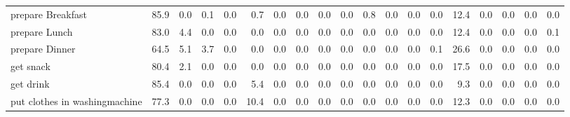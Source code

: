 \documentclass{article}
\begin{document}
\begin{sideways}
\begin{tabular}{lrrrrrrrrrrrrrrrrrr}
prepare Breakfast             &        85.9 &                0.0 &           0.1 &                          0.0 &                0.7 &                0.0 &                        0.0 &          0.0 &              0.0 &                0.8 &                    0.0 &                      0.0 &                  0.0 &                  12.4 &              0.0 &              0.0 &                                  0.0 &          0.0 \\
prepare Lunch                 &        83.0 &                4.4 &           0.0 &                          0.0 &                0.0 &                0.0 &                        0.0 &          0.0 &              0.0 &                0.0 &                    0.0 &                      0.0 &                  0.0 &                  12.4 &              0.0 &              0.0 &                                  0.0 &          0.1 \\
prepare Dinner                &        64.5 &                5.1 &           3.7 &                          0.0 &                0.0 &                0.0 &                        0.0 &          0.0 &              0.0 &                0.0 &                    0.0 &                      0.0 &                  0.1 &                  26.6 &              0.0 &              0.0 &                                  0.0 &          0.0 \\
get snack                     &        80.4 &                2.1 &           0.0 &                          0.0 &                0.0 &                0.0 &                        0.0 &          0.0 &              0.0 &                0.0 &                    0.0 &                      0.0 &                  0.0 &                  17.5 &              0.0 &              0.0 &                                  0.0 &          0.0 \\
get drink                     &        85.4 &                0.0 &           0.0 &                          0.0 &                5.4 &                0.0 &                        0.0 &          0.0 &              0.0 &                0.0 &                    0.0 &                      0.0 &                  0.0 &                   9.3 &              0.0 &              0.0 &                                  0.0 &          0.0 \\
put clothes in washingmachine &        77.3 &                0.0 &           0.0 &                          0.0 &               10.4 &                0.0 &                        0.0 &          0.0 &              0.0 &                0.0 &                    0.0 &                      0.0 &                  0.0 &                  12.3 &              0.0 &              0.0 &                                  0.0 &          0.0 \\

\end{tabular}
\end{sideways}
\end{document}
